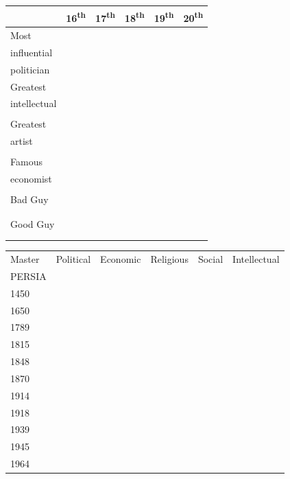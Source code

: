 \documentclass[12pt]{article}
\begin{document}
\begin{enumerate}
\begin{tabular}{|l|l|l|l|l|l|}
\hline
 & 16\textsuperscript{th} & 17\textsuperscript{th} & 18\textsuperscript{th} & 19\textsuperscript{th} & 20\textsuperscript{th} \\
\hline
Most & & & & & \\
influential & & & & & \\
politician & & & & & \\
\hline
Greatest & & & & & \\
intellectual & & & & & \\
& & & & & \\
\hline
Greatest & & & & & \\
artist & & & & & \\
& & & & & \\
\hline
Famous & & & & & \\
economist & & & & & \\
    & & & & & \\
\hline
Bad Guy & & & & & \\
    & & & & & \\
    & & & & & \\
\hline
Good Guy & & & & & \\
    & & & & & \\
    & & & & & \\
\hline

\end{tabular}

\begin{tabular}{|l|l|l|l|l|l|}

\hline
Master & Political & Economic & Religious & Social & Intellectual\\
PERSIA & & & & & \\
\hline
1450 & & & & & \\
\hline
1650 & & & & & \\
\hline
1789 & & & & & \\
\hline
1815 & & & & & \\
\hline
1848 & & & & & \\
\hline
1870 & & & & & \\
\hline
1914 & & & & & \\
\hline
1918 & & & & & \\
\hline
1939 & & & & & \\
\hline
1945 & & & & & \\
\hline
1964 & & & & & \\
\hline



\end{tabular}

\end{enumerate}
\end{document}
